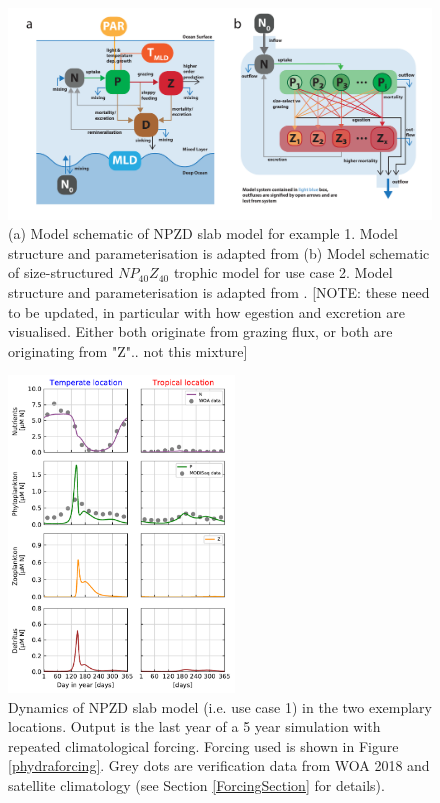 \documentclass[template.tex]{subfiles}
\begin{document}
\begin{figure}[t]
\includegraphics[width=15cm]{Figures/firstdraft_schematics/02__schematics_NPZDandChemostat.pdf}
\caption{(a) Model schematic of NPZD slab model for example 1. Model structure and parameterisation is adapted
from \citet{Anderson2015c} (b) Model schematic of size-structured $NP_{40}Z_{40}$ trophic model for use case 2. Model structure and parameterisation is adapted from \citet{Banas2011b}. [NOTE: these need to be updated, in particular with how egestion and excretion are visualised. Either both originate from grazing flux, or both are originating from "Z".. not this mixture]}
\label{Figure:phydraschematics_1}
\end{figure}


\begin{figure}[t]
\includegraphics[width=6cm]{Figures/firstdraft_plots/02_NPZDslab.pdf}
\caption{Dynamics of NPZD slab model (i.e. use case 1) in the two exemplary locations. Output is the last year of a 5 year simulation with repeated climatological forcing. Forcing used is shown in Figure \ref{phydraforcing}. Grey dots are verification data from WOA 2018 and satellite climatology (see Section \ref{ForcingSection} for details).}
\label{Figure:NPZDslab_results}
\end{figure}
\end{document}
